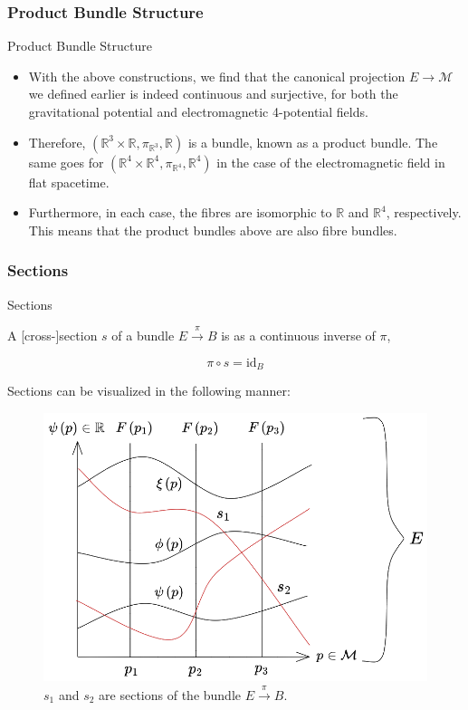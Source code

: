 \documentclass[9pt,handout]{beamer}
\begin{document}
\subsubsection{Product Bundle Structure}
\begin{frame}{Product Bundle Structure}
\begin{itemize}
\item With the above constructions, we find that the canonical projection $E \to \mathcal{M}$ we defined earlier is indeed continuous and surjective, for both the gravitational potential and electromagnetic 4-potential fields.

\item Therefore, $\left( \mathbb{R}^3 \times \mathbb{R}, \pi_{\mathbb{R}^3}, \mathbb{R} \right)$ is a bundle, known as a product bundle. The same goes for $\left( \mathbb{R}^4 \times \mathbb{R}^4, \pi_{\mathbb{R}^4}, \mathbb{R}^4 \right)$ in the case of the electromagnetic field in flat spacetime.

\item Furthermore, in each case, the fibres are isomorphic to $\mathbb{R}$ and $\mathbb{R}^4$, respectively. This means that the product bundles above are also fibre bundles.
\end{itemize}    
\end{frame}

\subsubsection{Sections}
\begin{frame}{Sections}
\begin{definition}[Section]
A [cross-]section $s$ of a bundle $E \overset{\pi}{\to} B$ is as a continuous inverse of $\pi$,

$$\pi \circ s = \text{id}_{B}$$
\end{definition}

Sections can be visualized in the following manner:

\begin{figure}[H]
\centering
\includegraphics[scale=0.2]{section}
\caption{$s_1$ and $s_2$ are sections of the bundle $E \overset{\pi}{\to} B$.}
\end{figure}
\end{frame}
\end{document}
